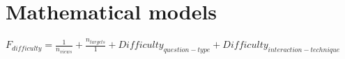 

\chapter{Mathematical models}

$
F_{difficulty} = \frac{1}{n_{views}} + \frac{n_{targets}}{1} + Difficulty_{question-type} + Difficulty_{interaction-technique}
$